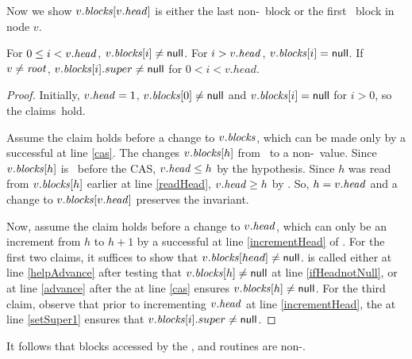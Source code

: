 Now we show $v.\mbox{\textit{blocks}}[v.\mbox{\textit{head}}]$ is either the last non-\nl\ block or the first \nl\ block in node $v$.

\begin{invariant}\label{lem::headPosition} 
For $0 \leq i < v.\mbox{\textit{head}}$, $v.\mbox{\textit{blocks}}[i]\neq\mbox{\sf null}$.  For $i>v.\mbox{\textit{head}}$, $v.\mbox{\textit{blocks}}[i]=\mbox{\sf null}$.
If $v\neq \mbox{\textit{root}}$,  $v.\mbox{\textit{blocks}}[i].super \neq \mbox{\sf null}$ for $0<i<v.head$.
\end{invariant}

\begin{proof}
Initially, $v.\mbox{\textit{head}}=1$, $v.\mbox{\textit{blocks}}[0]\neq\mbox{\sf null}$  and $v.\mbox{\textit{blocks}}[i]=\mbox{\sf null}$ for  $i>0$, so the claims~hold.

Assume the claim holds before a change to $v.\mbox{\textit{blocks}}$, which can be made only
by a successful  at line \ref{cas}.
The  changes $v.\mbox{\textit{blocks}}[h]$ from \nl\ to a non-\nl\ value.
Since $v.\mbox{\textit{blocks}}[h]$ is \nl\ before the CAS, $v.\mbox{\textit{head}} \leq h$ by the hypothesis.
Since $h$ was read from $v.\mbox{\textit{blocks}}[h]$ earlier at line \ref{readHead}, 
$v.\mbox{\textit{head}} \geq h$ by .
So, $h=v.\mbox{\textit{head}}$ and a change to $v.\mbox{\textit{blocks}}[v.\mbox{\textit{head}}]$ preserves the invariant.

Now, assume the claim holds before a change to $v.\mbox{\textit{head}}$, which can only be an increment from $h$ to $h+1$
by a successful  at line \ref{incrementHead} of .
For the first two claims, it suffices to show that $v.\mbox{\textit{blocks}}[head] \neq \mbox{\sf null}$.
 is called either at line \ref{helpAdvance} 
after testing that $v.\mbox{\textit{blocks}}[h]\neq\mbox{\sf null}$ at line \ref{ifHeadnotNull},
or at line \ref{advance} after the  at line \ref{cas} ensures $v.\mbox{\textit{blocks}}[h]\neq\mbox{\sf null}$.
For the third claim, observe that prior to incrementing $v.\mbox{\textit{head}}$ at line \ref{incrementHead},
the  at line \ref{setSuper1} ensures that $v.\mbox{\textit{blocks}}[i].super\neq \mbox{\sf null}$.
\end{proof}

It follows that blocks accessed by the ,  and  routines are non-\nl.

